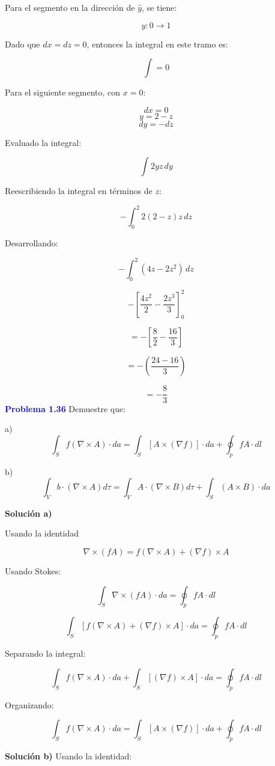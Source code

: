 \documentclass{article}
\newcommand{\question}[1]{\textcolor{blue}{\textbf{#1}}}
\begin{document}
Para el segmento en la dirección de $\hat{y}$, se tiene:

\[
y: 0 \to 1
\]

Dado que $dx = dz = 0$, entonces la integral en este tramo es:

\[
\int = 0
\]

Para el siguiente segmento, con $x = 0$:

\[
dx = 0
\]
\[
y = 2 - z
\]
\[
dy = -dz
\]

Evaluado la integral:

\[
\int 2 yz \, dy
\]

Reescribiendo la integral en términos de $z$:

\[
-\int_0^2 2(2 - z)z \, dz
\]

Desarrollando:

\[
-\int_0^2 (4z - 2z^2) \, dz
\]

\[
-\left[ \frac{4z^2}{2} - \frac{2z^3}{3} \right]_0^2
\]

\[
=-\left[ \frac{8}{2} - \frac{16}{3} \right]
\]

\[
=-\left( \frac{24 - 16}{3} \right)
\]

\[
\boxed{ =-\frac{8}{3}}
\]
\question{Problema  1.36} Demuestre que:

a) 
\[
\int_S f (\nabla \times A) \cdot da = \int_S [ A \times (\nabla f)] \cdot da + \oint_p f A \cdot dl
\]

b) 
\[
\int_V b \cdot (\nabla \times A) d\tau = \int_V A \cdot (\nabla \times B) d\tau + \int_S (A \times B) \cdot da
\]

\textbf{Solución a)}

Usando la identidad

\[
\nabla \times (f A) = f (\nabla \times A) + (\nabla f) \times A
\]

Usando Stokes:

\[
\int_S \nabla \times (f A) \cdot da = \oint_p f A \cdot dl
\]

\[
\int_S [ f (\nabla \times A) + (\nabla f) \times A ] \cdot da = \oint_p f A \cdot dl
\]

Separando la integral:

\[
\int_S f (\nabla \times A) \cdot da + \int_S [ (\nabla f) \times A ] \cdot da = \oint_p f A \cdot dl
\]

Organizando:

\[
\int_S f (\nabla \times A) \cdot da = \int_S [ A \times (\nabla f)] \cdot da + \oint_p f A \cdot dl
\]

\textbf{Solución b)}
Usando la identidad:
\end{document}
